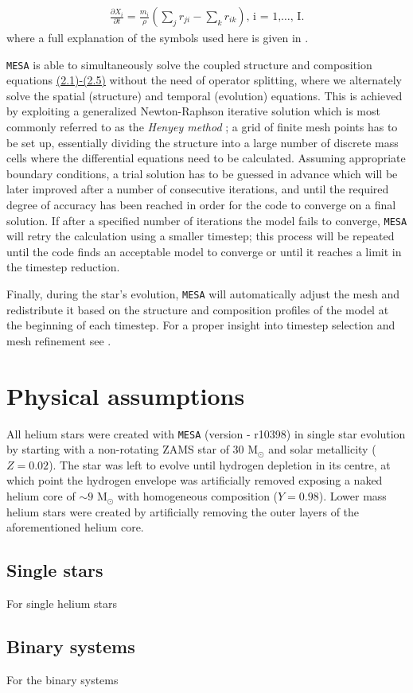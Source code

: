 \documentclass[../../main/thesis_msc.tex]{subfiles}
\begin{document}
    			\begin{eqnarray}
    				\frac{\partial X_i}{\partial t} = \frac{m_i}{\rho} \left( \sum_j r_{ji} - \sum_k r_{ik} \right) \text{, i = 1,$\dots$, I.} \label{eq:2.5}
    			\end{eqnarray}
    			where a full explanation of the symbols used here is given in \cite[][p. 89]{Kipp_book}. 
    			
    			\texttt{MESA} is able to simultaneously solve the coupled structure and composition equations \hyperref[eq:2.1]{(2.1)-(2.5)} without the need of operator splitting, where we alternately solve the spatial (structure) and temporal (evolution) equations. This is achieved by exploiting a generalized Newton-Raphson iterative solution which is most commonly referred to as the \emph{Henyey method} \citep[][p. 106]{Wilson1981, Kipp_book}; a grid of finite mesh points has to be set up, essentially dividing the structure into a large number of discrete mass cells where the differential equations need to be calculated. Assuming appropriate boundary conditions, a trial solution has to be guessed in advance which will be later improved after a number of consecutive iterations, and until the required degree of accuracy has been reached in order for the code to converge on a final solution. If after a specified number of iterations the model fails to converge, \texttt{MESA} will retry the calculation using a smaller timestep; this process will be repeated until the code finds an acceptable model to converge or until it reaches a limit in the timestep reduction.
    			
    			Finally, during the star's evolution, \texttt{MESA} will automatically adjust the mesh and redistribute it based on the structure and composition profiles of the model at the beginning of each timestep. For a proper insight into timestep selection and mesh refinement see \cite{Paxton2011}.
    			
    		\section{Physical assumptions}
    		
    			All helium stars were created with \texttt{MESA} (version - r10398) in single star evolution by starting with a non-rotating ZAMS star of $30$ M$_{\odot}$ and solar metallicity ($Z = 0.02$). The star was left to evolve until hydrogen depletion in its centre, at which point the hydrogen envelope was artificially removed exposing a naked helium core of $\sim 9$ M$_{\odot}$ with homogeneous composition ($Y = 0.98$). Lower mass helium stars were created by artificially removing the outer layers of the aforementioned helium core.
    			
    				\subsection{Single stars}
    				
    					For single helium stars
    					
    				\subsection{Binary systems}
    				
    					For the binary systems
    
    
    
    
\end{document}
